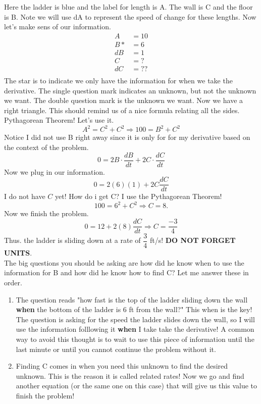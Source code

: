 \documentclass[10pt]{article}
\theoremstyle{Theorem}
\theoremstyle{definition}
\theoremstyle{remark}
\theoremstyle{custom}
\begin{document}
\begin{center}
    \end{center}
Here the ladder is blue and the label for length is A. The wall is C and the floor is B. Note we will use dA to represent the speed of change for these lengths. Now let's make sens  of our information. 
\begin{align*}
A&=10\\[2pt]
B*&=6\\[2pt]
dB&=1\\[2pt]
C&=?\\[2pt]
dC&=??\\[2pt]
\end{align*}
The star is to indicate we only have the information for when we take the derivative. The single question mark indicates an unknown, but not the unknown we want. The double question mark is the unknown we want. Now we have a right triangle. This should remind us of a nice formula relating all the sides. Pythagorean Theorem! Let's use it. 
\[
A^2=C^2+C^2 \Rightarrow 100=B^2+C^2
\]
Notice I did not use B right away since it is only for for my derivative based on the context of the problem. 
\[
0=2B\cdot \dfrac{dB}{dt}+2C \cdot \dfrac{dC}{dt}
\]
Now we plug in our information.
\[
0=2(6)(1)+2C\dfrac{dC}{dt}
\]
I do not have $C$ yet! How do i get C? I use the Pythagorean Theorem! 
\[
100=6^2+C^2 \Rightarrow C=8.
\]
Now we finish the problem.
\[
0=12+2(8)\dfrac{dC}{dt}\Rightarrow C=\dfrac{-3}{4}
\]
Thus. the ladder is sliding down at a rate of $\dfrac{3}{4}$ ft/s! \textbf{DO NOT FORGET UNITS}.\\
The big questions you should be asking are how did he know when to use the information for B and how did he know how to find C? Let me answer these in order.
\begin{enumerate}[1.]
\item The question reads "how fast is the top of the ladder sliding down the wall \textbf{when} the bottom of the ladder is 6 ft from the wall?" This when is the key! The question is asking for the speed the ladder slides down the wall, so I will use the information folllowing it \textbf{when} I take take the derivative! A common way to avoid this thought is to wait to use this piece of information until the last minute or until you cannot continue the problem without it.
\item Finding C comes in when you need this unknown to find the desired unknown. This is the reason it is called related rates! Now we go and find another equation (or the same one on this case) that will give us this value to finish the problem!
\end{enumerate}
\end{document}
